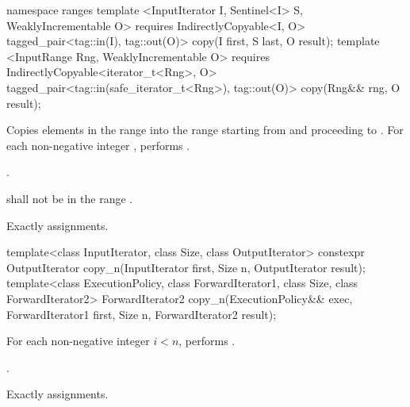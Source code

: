 \begin{addedblock}
%
\begin{itemdecl}
namespace ranges {
  template <InputIterator I, Sentinel<I> S, WeaklyIncrementable O>
      requires IndirectlyCopyable<I, O>
    tagged_pair<tag::in(I), tag::out(O)> copy(I first, S last, O result);
  template <InputRange Rng, WeaklyIncrementable O>
      requires IndirectlyCopyable<iterator_t<Rng>, O>
    tagged_pair<tag::in(safe_iterator_t<Rng>), tag::out(O)> copy(Rng&& rng, O result);
}
\end{itemdecl}

\begin{itemdescr}
\pnum
\effects Copies elements in the range  into the range
 starting from  and
proceeding to . For each non-negative integer
, performs .

\pnum
\returns {}.

\pnum
\requires {} shall not be in the range .

\pnum
\complexity Exactly  assignments.
\end{itemdescr}
\end{addedblock}

%
\begin{itemdecl}
template<class InputIterator, class Size, class OutputIterator>
  constexpr OutputIterator copy_n(InputIterator first, Size n,
                                  OutputIterator result);
template<class ExecutionPolicy, class ForwardIterator1, class Size, class ForwardIterator2>
  ForwardIterator2 copy_n(ExecutionPolicy&& exec,
                          ForwardIterator1 first, Size n,
                          ForwardIterator2 result);
\end{itemdecl}

\begin{itemdescr}
\pnum
\effects For each non-negative integer
$i < n$, performs .

\pnum
\returns {}.

\pnum
\complexity Exactly  assignments.
\end{itemdescr}

